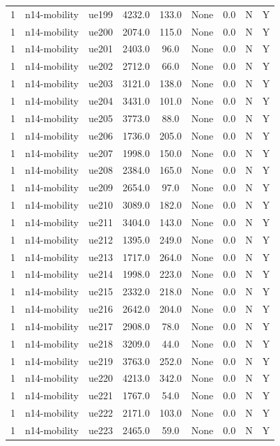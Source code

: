 \begin{table}[ht]
\begin{tabular}{|c|c|c|c|c|c|c|c|c|}
1 & n14-mobility & ue199 & 4232.0 & 133.0 & None & 0.0 & N & Y \\
1 & n14-mobility & ue200 & 2074.0 & 115.0 & None & 0.0 & N & Y \\
1 & n14-mobility & ue201 & 2403.0 & 96.0 & None & 0.0 & N & Y \\
1 & n14-mobility & ue202 & 2712.0 & 66.0 & None & 0.0 & N & Y \\
1 & n14-mobility & ue203 & 3121.0 & 138.0 & None & 0.0 & N & Y \\
1 & n14-mobility & ue204 & 3431.0 & 101.0 & None & 0.0 & N & Y \\
1 & n14-mobility & ue205 & 3773.0 & 88.0 & None & 0.0 & N & Y \\
1 & n14-mobility & ue206 & 1736.0 & 205.0 & None & 0.0 & N & Y \\
1 & n14-mobility & ue207 & 1998.0 & 150.0 & None & 0.0 & N & Y \\
1 & n14-mobility & ue208 & 2384.0 & 165.0 & None & 0.0 & N & Y \\
1 & n14-mobility & ue209 & 2654.0 & 97.0 & None & 0.0 & N & Y \\
1 & n14-mobility & ue210 & 3089.0 & 182.0 & None & 0.0 & N & Y \\
1 & n14-mobility & ue211 & 3404.0 & 143.0 & None & 0.0 & N & Y \\
1 & n14-mobility & ue212 & 1395.0 & 249.0 & None & 0.0 & N & Y \\
1 & n14-mobility & ue213 & 1717.0 & 264.0 & None & 0.0 & N & Y \\
1 & n14-mobility & ue214 & 1998.0 & 223.0 & None & 0.0 & N & Y \\
1 & n14-mobility & ue215 & 2332.0 & 218.0 & None & 0.0 & N & Y \\
1 & n14-mobility & ue216 & 2642.0 & 204.0 & None & 0.0 & N & Y \\
1 & n14-mobility & ue217 & 2908.0 & 78.0 & None & 0.0 & N & Y \\
1 & n14-mobility & ue218 & 3209.0 & 44.0 & None & 0.0 & N & Y \\
1 & n14-mobility & ue219 & 3763.0 & 252.0 & None & 0.0 & N & Y \\
1 & n14-mobility & ue220 & 4213.0 & 342.0 & None & 0.0 & N & Y \\
1 & n14-mobility & ue221 & 1767.0 & 54.0 & None & 0.0 & N & Y \\
1 & n14-mobility & ue222 & 2171.0 & 103.0 & None & 0.0 & N & Y \\
1 & n14-mobility & ue223 & 2465.0 & 59.0 & None & 0.0 & N & Y \\

\end{tabular}
\end{table}
